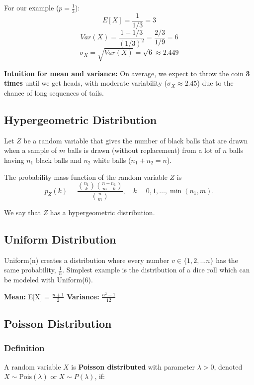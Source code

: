 \documentclass[12pt]{article}
\begin{document}
For our example (\( p = \tfrac{1}{3} \)):
\[
E[X] = \frac{1}{1/3} = 3
\]
\[
Var(X) = \frac{1 - 1/3}{(1/3)^2} = \frac{2/3}{1/9} = 6
\]
\[
\sigma_X = \sqrt{Var(X)} = \sqrt{6} \approx 2.449
\]

\textbf{Intuition for mean and variance:}\newline
On average, we expect to throw the coin \textbf{3 times} until we get heads, with moderate variability (\( \sigma_X \approx 2.45 \)) due to the chance of long sequences of tails.


\subsection{
    Hypergeometric Distribution
}

Let $Z$ be a random variable that gives the number of black balls that are drawn when a sample of $m$ balls is drawn (without replacement) from a lot of $n$ balls having $n_1$ black balls and $n_2$ white balls ($n_1 + n_2 = n$). 

The probability mass function of the random variable $Z$ is
\begin{equation}
p_Z(k) = \frac{\binom{n_1}{k} \binom{n-n_1}{m-k}}{\binom{n}{m}}, \quad k = 0, 1, \ldots, \min(n_1, m).
\end{equation}

We say that $Z$ has a hypergeometric distribution.


\subsection{
    Uniform Distribution
}

Uniform(n) creates a distribution where every number $v \in \{1, 2, ... n \}$ has the same probability, $\frac{1}{n}$. Simplest example is the distribution of a dice roll which can be modeled with Uniform(6).

\textbf{Mean:} E[X] = $\frac{n + 1}{2}$\newline
\textbf{Variance:} $\frac{n^2 - 1}{12}$

\subsection{
    Poisson Distribution
}

\subsubsection{Definition}

A random variable $X$ is \textbf{Poisson distributed} with parameter $\lambda > 0$, denoted $X \sim \text{Pois}(\lambda)$ or $X \sim P(\lambda)$, if:
\end{document}
